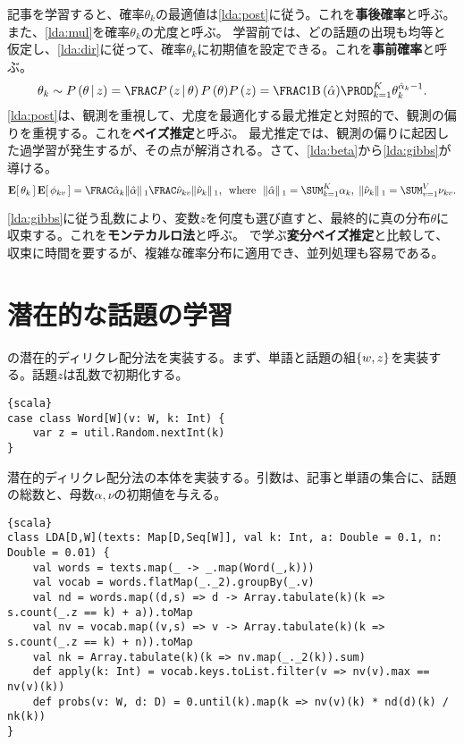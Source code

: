 \documentclass[10pt,a4paper]{book}
\begin{document}
%
記事を学習すると、確率$\theta_k$の最適値は\eqref{lda:post}に従う。これを\textbf{事後確率}と呼ぶ。また、\eqref{lda:mul}を確率$\theta_k$の尤度と呼ぶ。
学習前では、どの話題の出現も均等と仮定し、\eqref{lda:dir}に従って、確率$\theta_k$に初期値を設定できる。これを\textbf{事前確率}と呼ぶ。
%
\begin{equation}
\label{eq:lda:post}
\theta_k \sim
\Prob{\theta}[z] =
\frac{\Prob{z}[\theta] \Prob{\theta}}{\Prob{z}} =
\frac{1}{\Bd{\hat{\alpha}}} \prod_{k=1}^K \theta_k^{\hat{\alpha}_k-1}.
\end{equation}
%
\eqref{lda:post}は、観測を重視して、尤度を最適化する最尤推定と対照的で、観測の偏りを重視する。これを\textbf{ベイズ推定}と呼ぶ。
最尤推定では、観測の偏りに起因した過学習が発生するが、その点が解消される。さて、\eqref{lda:beta}から\eqref{lda:gibbs}が導ける。
%
\begin{equation}
\label{eq:lda:gibbs}
\E{\theta_k} \E{\phi_{kv}} =
\frac{\hat{\alpha}_k}{\norm{\hat{\alpha}}_1}
\frac{\hat{\nu}_{kv}}{\norm{\hat{\nu}_k}_1},
\where
\norm{\hat{\alpha}}_1 = \sum_{k=1}^K \alpha_k,\esp
\norm{\hat{\nu}_k}_1 = \sum_{v=1}^V \nu_{kv}.
\end{equation}
%
\eqref{lda:gibbs}に従う乱数により、変数$z$を何度も選び直すと、最終的に真の分布$\theta$に収束する。これを\textbf{モンテカルロ法}と呼ぶ。
で学ぶ\textbf{変分ベイズ推定}と比較して、収束に時間を要するが、複雑な確率分布に適用でき、並列処理も容易である。

\section{潜在的な話題の学習}

の潜在的ディリクレ配分法を実装する。まず、単語と話題の組$\seq{w,z}$を実装する。話題$z$は乱数で初期化する。

\begin{Verbatim}{scala}
case class Word[W](v: W, k: Int) {
	var z = util.Random.nextInt(k)
}
\end{Verbatim}

潜在的ディリクレ配分法の本体を実装する。引数は、記事と単語の集合に、話題の総数と、母数$\alpha,\nu$の初期値を与える。

\begin{Verbatim}{scala}
class LDA[D,W](texts: Map[D,Seq[W]], val k: Int, a: Double = 0.1, n: Double = 0.01) {
	val words = texts.map(_ -> _.map(Word(_,k)))
	val vocab = words.flatMap(_._2).groupBy(_.v)
	val nd = words.map((d,s) => d -> Array.tabulate(k)(k => s.count(_.z == k) + a)).toMap
	val nv = vocab.map((v,s) => v -> Array.tabulate(k)(k => s.count(_.z == k) + n)).toMap
	val nk = Array.tabulate(k)(k => nv.map(_._2(k)).sum)
	def apply(k: Int) = vocab.keys.toList.filter(v => nv(v).max == nv(v)(k))
	def probs(v: W, d: D) = 0.until(k).map(k => nv(v)(k) * nd(d)(k) / nk(k))
}
\end{Verbatim}
\end{document}
